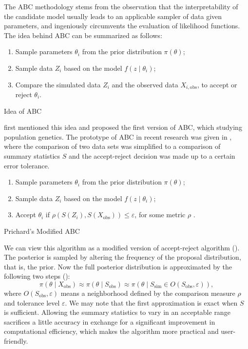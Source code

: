 The ABC methodology  {stems from} the observation
that the interpretability of the candidate model usually leads to
an applicable sampler of data given parameters, and ingeniously circumvents
the evaluation of likelihood functions. The idea behind ABC can be
summarized as follows: 
\begin{algorithm}[H]
\begin{enumerate}
\item Sample parameters $\theta_{i}$ from the prior distribution $\pi\left(\theta\right)$;
\item Sample data $Z_{i}$ based on the model $f\left(z\mid\theta_{i}\right)$;
\item Compare the simulated data $Z_{i}$ and the observed data $X_{i,\mathrm{obs}}$,
to accept or reject $\theta_{i}$.
\end{enumerate}
\protect\caption{Idea of ABC}
\end{algorithm}
 \citet{rubin1984bayesianly} first mentioned this idea and \citet{tavare1997inferring}
proposed the first version of ABC, which studying population genetics.
The prototype of ABC in recent research was given in \citet{pritchard1999population},
where the comparison of two data sets was simplified to a comparison
of summary statistics $S$ and the accept-reject decision was made
up to a certain error tolerance. 
\begin{algorithm}[h]
\begin{enumerate}
\item Sample parameters $\theta_{i}$ from the prior distribution $\pi\left(\theta\right)$;
\item Sample data $Z_{i}$ based on the model $f\left(z\mid\theta_{i}\right)$;
\item Accept $\theta_{i}$ if $\rho\left(S\left(Z_{i}\right),S\left(X_{\mathrm{obs}}\right)\right)\le\varepsilon$, {{}
} {for some metric $\rho$} {.}
\end{enumerate}
\protect\caption{\label{alg:Prichard-ABC-1}Prichard's Modified ABC}
\end{algorithm}
We can view this algorithm as a modified version of accept-reject
algorithm (\citet{robert2013monte}). The posterior is sampled by
altering the frequency of the proposal distribution, that is, the
prior. Now the full posterior distribution is approximated by the
following two steps (\citet{fearnhead2012constructing}): 
\begin{equation}
\pi\left(\theta\mid X_{\mathrm{obs}}\right)\approx\pi\left(\theta\mid S_{\mathrm{obs}}\right)\approx\pi\left(\theta\mid S_{\mathrm{sim}}\in O\left(S_{\mathrm{obs}},\varepsilon\right)\right),\label{eq:two-step-approx-abc}
\end{equation}
where $O\left(S_{\mathrm{obs}},\varepsilon\right)$ means a neighborhood
defined by the comparison measure $\rho$ and tolerance level $\varepsilon$.
We may note that the first approximation is exact when $S$ is sufficient.
Allowing the summary statistics to vary in an acceptable range sacrifices
a little accuracy in exchange for a significant improvement in computational
efficiency, which {makes } the algorithm more practical
and user-friendly. 

